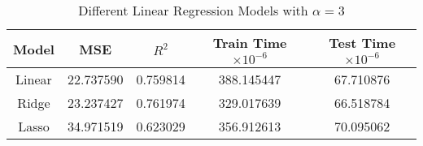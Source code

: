 \begin{table}[H]
\centering
\caption{Different Linear Regression Models with $\alpha = 3$}
\label{tab:modelsA3}
\begin{tabular}{ccccc}
\toprule
Model & MSE & $R^2$ & Train Time $\times 10^{-6}$ & Test Time $\times 10^{-6}$ \\
\midrule
Linear & 22.737590 & 0.759814 & 388.145447 & 67.710876 \\
Ridge & 23.237427 & 0.761974 & 329.017639 & 66.518784 \\
Lasso & 34.971519 & 0.623029 & 356.912613 & 70.095062 \\
\bottomrule
\end{tabular}
\end{table}
